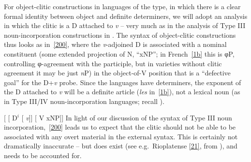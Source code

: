 \documentclass[output=paper]{langsci/langscibook}
\begin{document}
\begin{refcontext}
For object-clitic constructions in languages of the  type, in which
there is a clear formal identity between object  and definite
determiners, we will adopt an analysis in which the clitic is a D attached to
\emph{v} -- very much as in the analysis of Type III noun-incorporation
constructions in . The syntax of object-clitic constructions
thus looks as in~\eqref{200}, where the \emph{v}-adjoined D is associated with a
nominal constituent (some extended projection of N, \enquote{xNP}; in
French~\eqref{1b} this is φ{}P, controlling φ{}-agreement with the
participle, but in  varieties without clitic agreement it may be just
\emph{n}P) in the object-of-V position that is a \enquote{defective goal} for
the D+\emph{v} probe. Since the  languages have determiners, the
exponent of the D attached to \emph{v} will be a definite article (\emph{les}
in~\eqref{1b}), not a lexical noun (as in Type III/IV noun-incorporation
languages; recall ).

\ea  {}[ [ D$^i$ [ \hspace{-.7ex}\emph{v}\tss{\{[+V], \Acc{}, \ldots{}\}}]] [ V xNP]] \label{200}
\z
In light of our discussion of the syntax of Type III noun
incorporation,~\eqref{200} leads us to expect that the clitic should not be able
to be associated with any overt material in the external syntax. This is
certainly not dramatically inaccurate -- but  does exist (see
e.g.\ Rioplatense  \eqref{21}, from \citealt[32]{jaeggli86}), and needs to
be accounted for.\largerpage[-4]


\end{refcontext}
\end{document}
